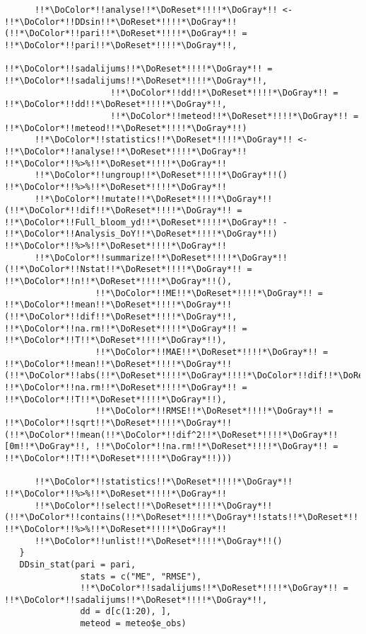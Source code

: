 \begin{verbatim}
      !!*\DoColor*!!analyse!!*\DoReset*!!!!*\DoGray*!! <- !!*\DoColor*!!DDsin!!*\DoReset*!!!!*\DoGray*!!(!!*\DoColor*!!pari!!*\DoReset*!!!!*\DoGray*!! = !!*\DoColor*!!pari!!*\DoReset*!!!!*\DoGray*!!,
                     !!*\DoColor*!!sadalijums!!*\DoReset*!!!!*\DoGray*!! = !!*\DoColor*!!sadalijums!!*\DoReset*!!!!*\DoGray*!!,
                     !!*\DoColor*!!dd!!*\DoReset*!!!!*\DoGray*!! = !!*\DoColor*!!dd!!*\DoReset*!!!!*\DoGray*!!,
                     !!*\DoColor*!!meteod!!*\DoReset*!!!!*\DoGray*!! = !!*\DoColor*!!meteod!!*\DoReset*!!!!*\DoGray*!!)
      !!*\DoColor*!!statistics!!*\DoReset*!!!!*\DoGray*!! <- !!*\DoColor*!!analyse!!*\DoReset*!!!!*\DoGray*!! !!*\DoColor*!!%>%!!*\DoReset*!!!!*\DoGray*!!
      !!*\DoColor*!!ungroup!!*\DoReset*!!!!*\DoGray*!!() !!*\DoColor*!!%>%!!*\DoReset*!!!!*\DoGray*!!
      !!*\DoColor*!!mutate!!*\DoReset*!!!!*\DoGray*!!(!!*\DoColor*!!dif!!*\DoReset*!!!!*\DoGray*!! = !!*\DoColor*!!Full_bloom_yd!!*\DoReset*!!!!*\DoGray*!! - !!*\DoColor*!!Analysis_DoY!!*\DoReset*!!!!*\DoGray*!!) !!*\DoColor*!!%>%!!*\DoReset*!!!!*\DoGray*!!
      !!*\DoColor*!!summarize!!*\DoReset*!!!!*\DoGray*!!(!!*\DoColor*!!Nstat!!*\DoReset*!!!!*\DoGray*!! = !!*\DoColor*!!n!!*\DoReset*!!!!*\DoGray*!!(),
                  !!*\DoColor*!!ME!!*\DoReset*!!!!*\DoGray*!! = !!*\DoColor*!!mean!!*\DoReset*!!!!*\DoGray*!!(!!*\DoColor*!!dif!!*\DoReset*!!!!*\DoGray*!!, !!*\DoColor*!!na.rm!!*\DoReset*!!!!*\DoGray*!! = !!*\DoColor*!!T!!*\DoReset*!!!!*\DoGray*!!),
                  !!*\DoColor*!!MAE!!*\DoReset*!!!!*\DoGray*!! = !!*\DoColor*!!mean!!*\DoReset*!!!!*\DoGray*!!(!!*\DoColor*!!abs(!!*\DoReset*!!!!*\DoGray*!!!!*\DoColor*!!dif!!*\DoReset*!!!!*\DoGray*!!), !!*\DoColor*!!na.rm!!*\DoReset*!!!!*\DoGray*!! = !!*\DoColor*!!T!!*\DoReset*!!!!*\DoGray*!!),
                  !!*\DoColor*!!RMSE!!*\DoReset*!!!!*\DoGray*!! = !!*\DoColor*!!sqrt!!*\DoReset*!!!!*\DoGray*!!(!!*\DoColor*!!mean(!!*\DoColor*!!dif^2!!*\DoReset*!!!!*\DoGray*!![0m!!*\DoGray*!!, !!*\DoColor*!!na.rm!!*\DoReset*!!!!*\DoGray*!! = !!*\DoColor*!!T!!*\DoReset*!!!!*\DoGray*!!)))

      !!*\DoColor*!!statistics!!*\DoReset*!!!!*\DoGray*!! !!*\DoColor*!!%>%!!*\DoReset*!!!!*\DoGray*!!
      !!*\DoColor*!!select!!*\DoReset*!!!!*\DoGray*!!(!!*\DoColor*!!contains(!!*\DoReset*!!!!*\DoGray*!!stats!!*\DoReset*!!!!*\DoGray*!!)) !!*\DoColor*!!%>%!!*\DoReset*!!!!*\DoGray*!!
      !!*\DoColor*!!unlist!!*\DoReset*!!!!*\DoGray*!!()
   }
   DDsin_stat(pari = pari,
               stats = c("ME", "RMSE"),
               !!*\DoColor*!!sadalijums!!*\DoReset*!!!!*\DoGray*!! = !!*\DoColor*!!sadalijums!!*\DoReset*!!!!*\DoGray*!!,
               dd = d[c(1:20), ],
               meteod = meteo$e_obs)


\end{verbatim}
